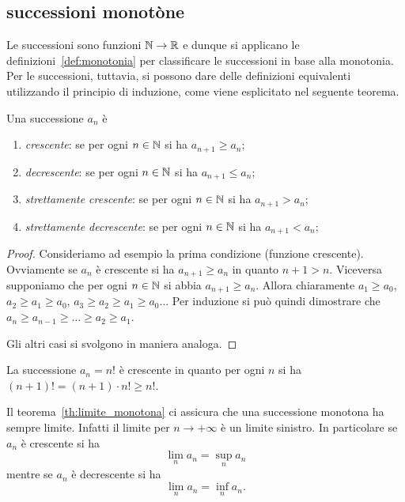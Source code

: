 \subsection{successioni monotòne}

Le successioni sono funzioni ${\mathbb N} \to {\mathbb R}$ e dunque si applicano 
le definizioni~\ref{def:monotonia} per
classificare le successioni in base alla monotonia.
Per le successioni, tuttavia, si possono dare delle definizioni
equivalenti utilizzando il principio di induzione,
come viene esplicitato nel seguente teorema.

\begin{theorem}
\mymark{***}
Una successione $a_n$ è
\begin{enumerate}
\item \emph{crescente}: se per ogni $n\in {\mathbb N}$ si ha $a_{n+1} \ge a_n$;
\item \emph{decrescente}: se per ogni $n\in {\mathbb N}$ si ha $a_{n+1} \le a_n$;
\item \emph{strettamente crescente}: se per ogni $n\in {\mathbb N}$ si ha $a_{n+1}>a_n$;
\item \emph{strettamente decrescente}: se per ogni $n\in {\mathbb N}$ si ha
$a_{n+1}<a_n$;
\end{enumerate}
\end{theorem}
%
\begin{proof}
  Consideriamo ad esempio la prima condizione (funzione crescente).
Ovviamente se $a_n$ è crescente si ha $a_{n+1}\ge a_n$ in quanto $n+1 > n$.
Viceversa supponiamo che per ogni $n\in {\mathbb N}$ si abbia $a_{n+1}\ge a_n$.  Allora
chiaramente $a_1\ge a_0$, $a_2\ge a_1 \ge a_0$, $a_3 \ge a_2 \ge a_1 \ge a_0$...
Per induzione si può quindi dimostrare che  $a_n \ge a_{n-1} \ge \dots \ge a_2
\ge a_1$.

Gli altri casi si svolgono in maniera analoga.
\end{proof}

\begin{example}
  La successione $a_n = n!$ è crescente 
  in quanto per ogni $n$ si ha $(n+1)! = (n+1)\cdot n! \ge n!$.
\end{example}

Il teorema~\ref{th:limite_monotona} ci assicura che una 
successione monotona ha sempre limite. 
Infatti il limite per $n\to +\infty$ è un limite sinistro.
In particolare se $a_n$ è crescente si ha 
\[
  \lim_n a_n = \sup_n a_n
\]
mentre se $a_n$ è decrescente si ha 
\[
  \lim_n a_n = \inf_n a_n.
\]


